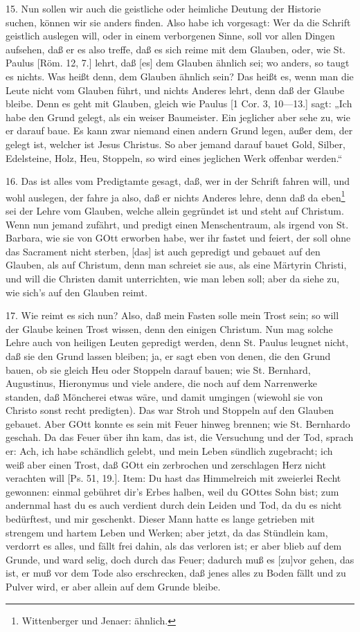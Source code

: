 15. Nun sollen wir auch die geistliche oder heimliche Deutung der Historie suchen, können wir sie anders finden. Also habe ich vorgesagt: Wer da die Schrift geistlich auslegen will, oder in einem verborgenen Sinne, soll vor allen Dingen aufsehen, daß er es also treffe, daß es sich reime mit dem Glauben, oder, wie St. Paulus [Röm. 12, 7.] lehrt, daß [es] dem Glauben ähnlich sei; wo anders, so taugt es nichts. Was heißt denn, dem Glauben ähnlich sein? Das heißt es, wenn man die Leute nicht vom Glauben führt, und nichts Anderes lehrt, denn daß der Glaube bleibe. Denn es geht mit Glauben, gleich wie Paulus [1 Cor. 3, 10—13.] sagt: „Ich habe den Grund gelegt, als ein weiser Baumeister. Ein jeglicher aber sehe zu, wie er darauf baue. Es kann zwar niemand einen andern Grund legen, außer dem, der gelegt ist, welcher ist Jesus Christus. So aber jemand darauf bauet Gold, Silber, Edelsteine, Holz, Heu, Stoppeln, so wird eines jeglichen Werk offenbar werden.“

16. Das ist alles vom Predigtamte gesagt, daß, wer in der Schrift fahren will, und wohl auslegen, der fahre ja also, daß er nichts Anderes lehre, denn daß da eben\footnote{Wittenberger und Jenaer: ähnlich.} sei der Lehre vom Glauben, welche allein gegründet ist und steht auf Christum. Wenn nun jemand zufährt, und predigt einen Menschentraum, als irgend von St. Barbara, wie sie von GOtt erworben habe, wer ihr fastet und feiert, der soll ohne das Sacrament nicht sterben, [das] ist auch gepredigt und gebauet auf den Glauben, als auf Christum, denn man schreiet sie aus, als eine Märtyrin Christi, und will die Christen damit unterrichten, wie man leben soll; aber da siehe zu, wie sich’s auf den Glauben reimt.

17. Wie reimt es sich nun? Also, daß mein Fasten solle mein Trost sein; so will der Glaube keinen Trost wissen, denn den einigen Christum. Nun mag solche Lehre auch von heiligen Leuten gepredigt werden, denn St. Paulus leugnet nicht, daß sie den Grund lassen bleiben; ja, er sagt eben von denen, die den Grund bauen, ob sie gleich Heu oder Stoppeln darauf bauen; wie St. Bernhard, Augustinus, Hieronymus und viele andere, die noch auf dem Narrenwerke standen, daß Möncherei etwas wäre, und damit umgingen (wiewohl sie von Christo sonst recht predigten). Das war Stroh und Stoppeln auf den Glauben gebauet. Aber GOtt konnte es sein mit Feuer hinweg brennen; wie St. Bernhardo geschah. Da das Feuer über ihn kam, das ist, die Versuchung und der Tod, sprach er: Ach, ich habe schändlich gelebt, und mein Leben sündlich zugebracht; ich weiß aber einen Trost, daß GOtt ein zerbrochen und zerschlagen Herz
nicht verachten will [Ps. 51, 19.]. Item: Du hast das Himmelreich mit zweierlei Recht gewonnen: einmal gebühret dir’s Erbes halben, weil du GOttes Sohn bist; zum andernmal hast du es auch verdient durch dein Leiden und Tod, da du es nicht bedürftest, und mir geschenkt. Dieser Mann hatte es lange getrieben mit strengem und hartem Leben und Werken; aber jetzt, da das Stündlein kam, verdorrt es alles, und fällt frei dahin, als das verloren ist; er aber blieb auf dem Grunde, und ward selig, doch durch das Feuer; dadurch muß es [zu]vor gehen, das ist, er muß vor dem Tode also erschrecken, daß jenes alles zu Boden fällt und zu Pulver wird, er aber allein auf dem Grunde bleibe.

